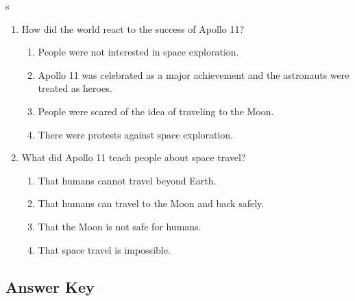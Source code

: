 s\documentclass[12pt]{article}
\begin{document}
\begin{enumerate}
    \item How did the world react to the success of Apollo 11?
    \begin{enumerate}[label=\Alph*.]
        \item People were not interested in space exploration.
        \item Apollo 11 was celebrated as a major achievement and the astronauts were treated as heroes.
        \item People were scared of the idea of traveling to the Moon.
        \item There were protests against space exploration.
    \end{enumerate}
    \vspace{0.5cm}

    \item What did Apollo 11 teach people about space travel?
    \begin{enumerate}[label=\Alph*.]
        \item That humans cannot travel beyond Earth.
        \item That humans can travel to the Moon and back safely.
        \item That the Moon is not safe for humans.
        \item That space travel is impossible.
    \end{enumerate}

\end{enumerate}
\vspace{1cm}

\subsection*{Answer Key}
\end{document}
